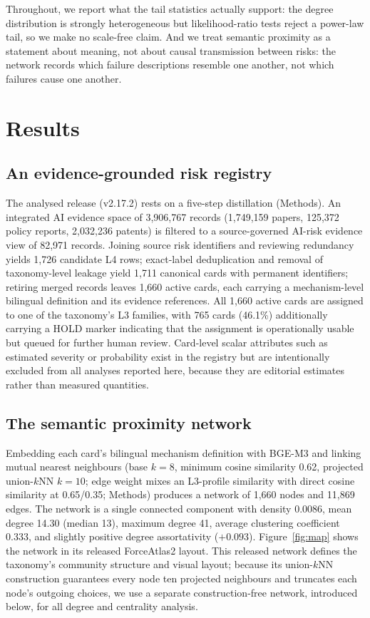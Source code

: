 \documentclass[fleqn,10pt]{wlscirep}
\begin{document}
Throughout, we report what the tail statistics actually support: the degree
distribution is strongly heterogeneous but likelihood-ratio tests reject a
power-law tail, so we make no scale-free claim\cite{clauset2009,broido2019}.
And we treat semantic proximity as a statement about meaning, not about
causal transmission between risks\cite{helbing2013}: the network records
which failure descriptions resemble one another, not which failures cause
one another.

\section*{Results}

\subsection*{An evidence-grounded risk registry}

The analysed release (v2.17.2) rests on a five-step distillation
(Methods). An integrated AI evidence space of 3,906,767 records (1,749,159
papers, 125,372 policy reports, 2,032,236 patents) is filtered to a
source-governed AI-risk evidence view of 82,971 records. Joining source risk
identifiers and reviewing redundancy yields 1,726 candidate L4 rows;
exact-label deduplication and removal of taxonomy-level leakage yield 1,711
canonical cards with permanent identifiers; retiring merged records leaves
1,660 active cards, each carrying a mechanism-level bilingual definition and
its evidence references. All 1,660 active cards are assigned to one of the
taxonomy's L3 families, with 765 cards (46.1\%) additionally carrying a HOLD
marker indicating that the assignment is operationally usable but queued for
further human review. Card-level scalar attributes such as estimated severity
or probability exist in the registry but are intentionally excluded from all
analyses reported here, because they are editorial estimates rather than
measured quantities.

\subsection*{The semantic proximity network}

Embedding each card's bilingual mechanism definition with BGE-M3 and linking
mutual nearest neighbours (base $k=8$, minimum cosine similarity 0.62,
projected union-$k$NN $k=10$; edge weight mixes an L3-profile similarity with
direct cosine similarity at 0.65/0.35; Methods) produces a network of 1,660
nodes and 11,869 edges. The network is a single connected component with
density 0.0086, mean degree 14.30 (median 13), maximum degree 41, average
clustering coefficient 0.333, and slightly positive degree assortativity
($+0.093$). Figure~\ref{fig:map} shows the network in its released
ForceAtlas2 layout\cite{jacomy2014}. This released network defines the
taxonomy's community structure and visual layout; because its union-$k$NN
construction guarantees every node ten projected neighbours and truncates
each node's outgoing choices, we use a separate construction-free network,
introduced below, for all degree and centrality analysis.
\end{document}
